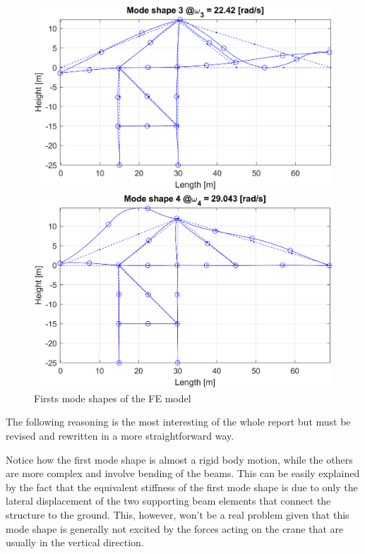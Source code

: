 \begin{figure}[H]
\begin{minipage}[b]{0.45\textwidth}
        \centering
        \includegraphics[width=\textwidth]{img/MATLAB/ModeShapes/Mode_03.png}
    \end{minipage}
    \hfill
    \begin{minipage}[b]{0.45\textwidth}
        \centering
        \includegraphics[width=\textwidth]{img/MATLAB/ModeShapes/Mode_04.png}
    \end{minipage}
    \caption{Firsts mode shapes of the FE model}
    \label{fig:mode_shapes}
\end{figure}

\begin{center}
    \huge{The following reasoning is the most interesting of the whole report but must be revised and rewritten in a more straightforward way.}
\end{center}

Notice how the first mode shape is almost a rigid body motion, while the others are more complex and involve bending of the beams.
This can be easily explained by the fact that the equivalent stiffness of the first mode shape is due to only the lateral displacement of the two supporting beam elements that connect the structure to the ground.
This, however, won't be a real problem given that this mode shape is generally not excited by the forces acting on the crane that are usually in the vertical direction.

